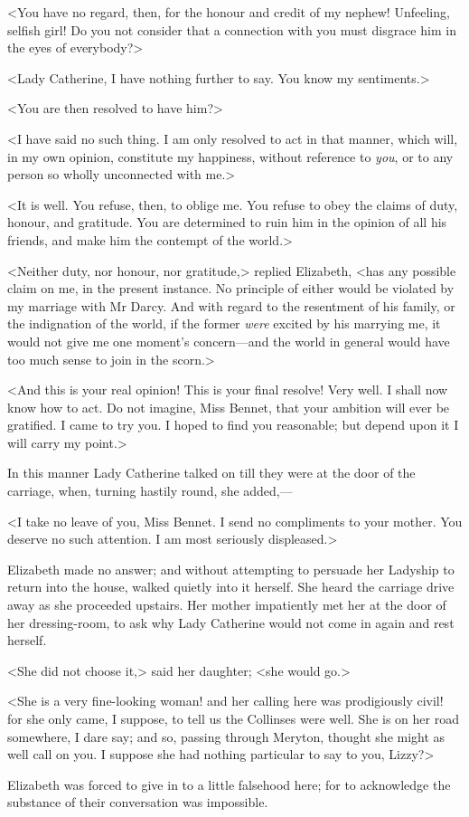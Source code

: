 <You have no regard, then, for the honour and credit of my nephew! Unfeeling, selfish girl! Do you not consider that a connection with you must disgrace him in the eyes of everybody?>

<Lady Catherine, I have nothing further to say. You know my sentiments.>

<You are then resolved to have him?>

<I have said no such thing. I am only resolved to act in that manner, which will, in my own opinion, constitute my happiness, without reference to \textit{you}, or to any person so wholly unconnected with me.>

<It is well. You refuse, then, to oblige me. You refuse to obey the claims of duty, honour, and gratitude. You are determined to ruin him in the opinion of all his friends, and make him the contempt of the world.>

<Neither duty, nor honour, nor gratitude,> replied Elizabeth, <has any possible claim on me, in the present instance. No principle of either would be violated by my marriage with Mr Darcy. And with regard to the resentment of his family, or the indignation of the world, if the former \textit{were} excited by his marrying me, it would not give me one moment's concern—and the world in general would have too much sense to join in the scorn.>

<And this is your real opinion! This is your final resolve! Very well. I shall now know how to act. Do not imagine, Miss Bennet, that your ambition will ever be gratified. I came to try you. I hoped to find you reasonable; but depend upon it I will carry my point.>

In this manner Lady Catherine talked on till they were at the door of the carriage, when, turning hastily round, she added,—

<I take no leave of you, Miss Bennet. I send no compliments to your mother. You deserve no such attention. I am most seriously displeased.>

Elizabeth made no answer; and without attempting to persuade her Ladyship to return into the house, walked quietly into it herself. She heard the carriage drive away as she proceeded upstairs. Her mother impatiently met her at the door of her dressing-room, to ask why Lady Catherine would not come in again and rest herself.

<She did not choose it,> said her daughter; <she would go.>

<She is a very fine-looking woman! and her calling here was prodigiously civil! for she only came, I suppose, to tell us the Collinses were well. She is on her road somewhere, I dare say; and so, passing through Meryton, thought she might as well call on you. I suppose she had nothing particular to say to you, Lizzy?>

Elizabeth was forced to give in to a little falsehood here; for to acknowledge the substance of their conversation was impossible.